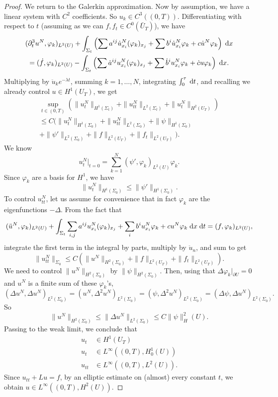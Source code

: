 \documentclass[a4paper]{article}
\begin{document}
\begin{proof}
  We return to the Galerkin approximation. Now by assumption, we have a linear system with $C^2$ coefficients. So $u_k \in C^3((0, T))$. Differentiating with respect to $t$ (assuming as we can $f, f_t \in C^0(\bar{U}_T)$), we have
  \begin{multline*}
    (\partial_t^3 u^N, \varphi_k)_{L^2(U)} + \int_{\Sigma_t} \left(\sum a^{ij} \dot{u}_{x_i}^N (\varphi_k)_{x_j} + \sum b^i \dot{u}_{x_i}^N \varphi_k + c \dot{u}^N \varphi_k \right) \;\mathrm{d} x\\
    = (\dot{f}, \varphi_k)_{L^2(U)} - \int_{\Sigma_t} \left( \sum \dot{a}^{ij} u_{x_i}^N (\varphi_k)_{x_j} + \sum \dot{b}^i u_{x_i}^N \varphi_k + \dot{c} u \varphi_k \right)\;\mathrm{d} x.
  \end{multline*}
  Multiplying by $\ddot{u}_k e^{-\lambda t}$, summing $k = 1, \ldots, N$, integrating $\int_0^\tau \;\mathrm{d} t$, and recalling we already control $u \in H^1(U_T)$, we get
  \begin{multline*}
    \sup_{t \in (0, T)} (\|u_t^N\|_{H^1(\Sigma_t)} + \|u_{tt}^N\|_{L^2(\Sigma_t)} + \|u_t^N\|_{H^2(U_T)})\\
    \leq C\Big(\|u_t^N\|_{H^1(\Sigma_0)} + \|u_{tt}^N\|_{L^2(\Sigma_0)} + \|\psi\|_{H^1(\Sigma_0)} \\
    + \|\psi'\|_{L^2(\Sigma_0)} + \|f\|_{L^2(U_T)} + \|f_t\|_{L^2(U_T)}\Big).
  \end{multline*}
  We know
  \[
    u_t^N|_{t = 0} = \sum_{k = 1}^N (\psi', \varphi_k)_{L^2(U)} \varphi_k.
  \]
  Since $\varphi_k$ are a basis for $H^1$, we have
  \[
    \|u_t^N\|_{H^1(\Sigma_0)} \leq \|\psi'\|_{H^1(\Sigma_0)}.
  \]
  To control $u^N_{tt}$, let us assume for convenience that in fact $\varphi_k$ are the eigenfunctions $-\Delta$. From the fact that
  \[
    (\ddot{u}^N, \varphi_k)_{L^2(U)} + \int_{\Sigma_t} \sum_{i, j} a^{ij} u_{x_i}^N (\varphi_k)_{x_j} + \sum_i b^i u_{x_i}^N \varphi_k + c u^N \varphi_k\;\mathrm{d} x\;\mathrm{d} t = (f, \varphi_k)_{L^2(U)},
  \]
  integrate the first term in the integral by parts, multiply by $\ddot{u}_n$, and sum to get
  \[
    \|u_{tt}^N\|_{\Sigma_0} \leq C(\|u^N\|_{H^2(\Sigma_0)} + \|f\|_{L^2(U_T)} + \|f_t\|_{L^2(U_T)}).
  \]
  We need to control $\|u^N\|_{H^2(\Sigma_0)}$ by $\|\psi\|_{H^2(\Sigma_0)}$. Then, using that $\Delta\varphi_k|_{\partial U} = 0$ and $u^N$ is a finite sum of these $\varphi_k$'s,
  \[
    (\Delta u^N, \Delta u^N)_{L^2\!(\Sigma_0)} = (u^N, \Delta^2 u^N)_{L^2\!(\Sigma_0)} = (\psi, \Delta^2 u^N)_{L^2\!(\Sigma_0)} = (\Delta \psi, \Delta u^N)_{L^2\!(\Sigma_0)}.
  \]
  So
  \[
    \|u^N\|_{H^2(\Sigma_0)} \leq \|\Delta u^N\|_{L^2(\Sigma_0)} \leq C \|\psi\|_H^2(U).
  \]
  Passing to the weak limit, we conclude that
  \begin{align*}
    u_t &\in H^1(U_T)\\
    u_t &\in L^\infty((0, T), H_0^1(U))\\
    u_{tt} &\in L^\infty((0, T), L^2(U)).
  \end{align*}
  Since $u_{tt} + Lu = f$, by an elliptic estimate on (almost) every constant $t$, we obtain $u \in L^\infty((0, T), H^2(U))$.
\end{proof}
\end{document}
